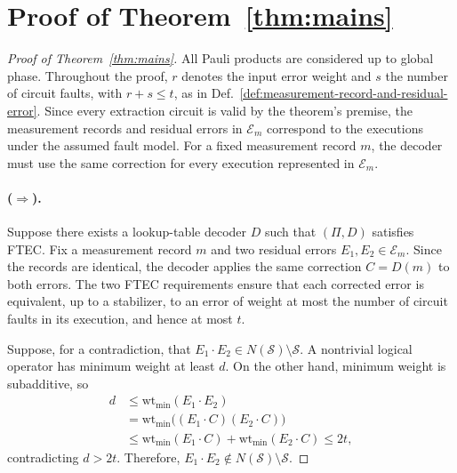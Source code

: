 \documentclass[acmsmall,screen,review,anonymous,nonacm]{acmart}
\newcommand{\cS}{\mathcal{S}}
\begin{document}




\newpage
\appendix
\section{Proof of Theorem~\ref{thm:mains}}
\label{app:proof}

\begin{proof}[Proof of Theorem~\ref{thm:mains}]
All Pauli products are considered up to global phase. Throughout the proof,
$r$ denotes the input error weight and $s$ the number of circuit faults,
with $r+s\le t$, as in Def.~\ref{def:measurement-record-and-residual-error}.
Since every extraction circuit is valid by the theorem's premise,
the measurement records and residual errors in $\mathcal E_m$
correspond to the executions under the assumed fault model.
For a fixed measurement record $m$, the decoder must use the same correction
for every execution represented in $\mathcal E_m$.

\paragraph{($\Rightarrow$).}
Suppose there exists a lookup-table decoder $D$ such that $(\Pi,D)$
satisfies FTEC. Fix a measurement record $m$ and two residual errors
$E_1,E_2\in\mathcal E_m$. Since the records are identical, the decoder
applies the same correction $C=D(m)$ to both errors.
The two FTEC requirements ensure that each corrected error is equivalent,
up to a stabilizer, to an error of weight at most the number of circuit
faults in its execution, and hence at most $t$.

Suppose, for a contradiction, that
$E_1\cdot E_2\in N(\cS)\setminus\cS$.
A nontrivial logical operator has minimum weight at least $d$.
On the other hand, minimum weight is subadditive, so
\[
\begin{aligned}
 d
 &\le \mathrm{wt}_{\min}(E_1\cdot E_2)\\
 &=\mathrm{wt}_{\min}\bigl((E_1\cdot C)(E_2\cdot C)\bigr)\\
 &\le\mathrm{wt}_{\min}(E_1\cdot C)+\mathrm{wt}_{\min}(E_2\cdot C)
 \le 2t,
\end{aligned}
\]
contradicting $d>2t$. Therefore,
$E_1\cdot E_2\notin N(\cS)\setminus\cS$.


\end{proof}
\end{document}
